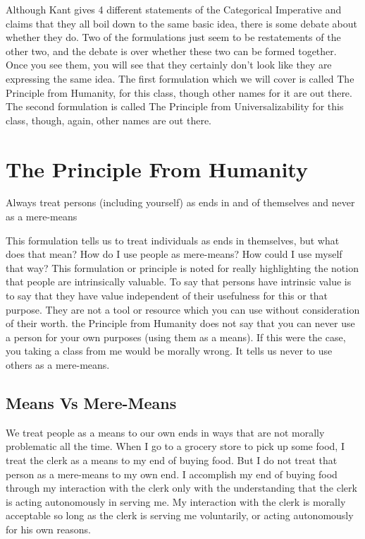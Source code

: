 Although Kant gives 4 different statements of the Categorical Imperative and claims that they all boil down to the same basic idea, there is some debate about whether they do. Two of the formulations just seem to be restatements of the other two, and the debate is over whether these two can be formed together. Once you see them, you will see that they certainly don't look like they are expressing the same idea. The first formulation which we will cover is called The Principle from Humanity, for this class, though other names for it are out there. The second formulation is called The Principle from Universalizability for this class, though, again, other names are out there.

\section{The Principle From Humanity}
\begin{center}
Always treat persons (including yourself) as ends in and of themselves and never as a mere-means
\end{center}
This formulation tells us to treat individuals as ends in themselves, but what does that mean? How do I use people as mere-means? How could I use myself that way? This formulation or principle is noted for really highlighting the notion that people are intrinsically valuable. To say that persons have intrinsic value is to say that they have value independent of their usefulness for this or that purpose.  They are not a tool or resource which you can use without consideration of their worth. the Principle from Humanity does not say that you can never use a person for your own purposes (using them as a means). If this were the case, you taking a class from me would be morally wrong. It tells us never to use others as a mere-means.

\subsection{Means Vs Mere-Means}

We treat people as a means to our own ends in ways that are not morally problematic all the time. When I go to a grocery store to pick up some food, I treat the clerk as a means to my end of buying food. But I do not treat that person as a mere-means to my own end. I accomplish my end of buying food through my interaction with the clerk only with the understanding that the clerk is acting autonomously in serving me. My interaction with the clerk is morally acceptable so long as the clerk is serving me voluntarily, or acting autonomously for his own reasons.

